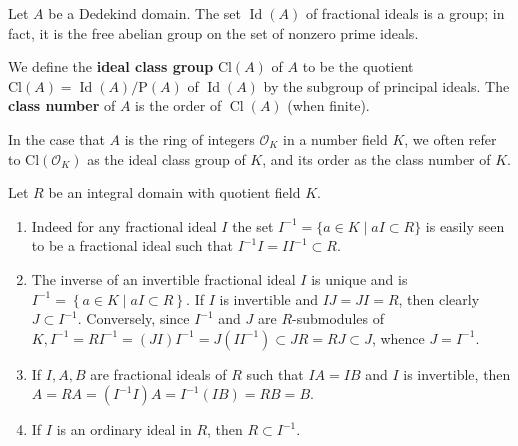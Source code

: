 \begin{theorem}
    Let $A$ be a Dedekind domain.
    The set $\operatorname{Id}(A)$ of fractional ideals is a group; in fact, it is the free abelian group on the set of nonzero prime ideals.
\end{theorem}



\begin{definition}
    We define the \textbf{ideal class group} $\mathrm{Cl}(A)$ of $A$ to be the quotient $\mathrm{Cl}(A)=\operatorname{Id}(A) / \mathrm{P}(A)$ of $\operatorname{Id}(A)$ by the subgroup of principal ideals.
    The \textbf{class number} of $A$ is the order of $\operatorname{Cl}(A)$ (when finite).

    In the case that $A$ is the ring of integers $\mathcal{O}_K$ in a number field $K$, we often refer to $\mathrm{Cl}\left(\mathcal{O}_K\right)$ as the ideal class group of $K$, and its order as the class number of $K$.
\end{definition}

\begin{proposition}
    Let $R$ be an integral domain with quotient field $K$.
    \begin{enumerate}
        \item
              Indeed for any fractional ideal $I$ the set $I^{-1}=\{a \in K \mid a I \subset R\}$ is easily seen to be a fractional ideal such that $I^{-1} I=I I^{-1} \subset R$.
        \item
              The inverse of an invertible fractional ideal $I$ is unique and is $I^{-1}=\left\{a \in K \mid a I \subset R\right\}$.
              If $I$ is invertible and $I J=J I=R$, then clearly $J \subset I^{-1}$.
              Conversely, since $I^{-1}$ and $J$ are $R$-submodules of $K, I^{-1}=R I^{-1}=(J I) I^{-1}=J\left(I I^{-1}\right) \subset J R=R J \subset J$, whence $J=I^{-1}$.
        \item
              If $I, A, B$ are fractional ideals of $R$ such that $I A=I B$ and $I$ is invertible, then $A=R A=\left(I^{-1} I\right) A=I^{-1}(I B)=R B=B$.
        \item
              If $I$ is an ordinary ideal in $R$, then $R \subset I^{-1}$.
    \end{enumerate}
\end{proposition}

